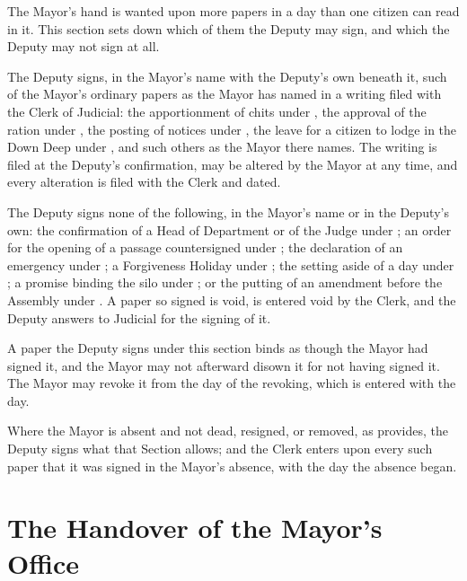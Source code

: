 The Mayor's hand is wanted upon more papers in a day than one citizen can read in it. This section sets down which of them the Deputy may sign, and which the Deputy may not sign at all.

\begin{clauses}
\item The Deputy signs, in the Mayor's name with the Deputy's own beneath it, such of the Mayor's ordinary papers as the Mayor has named in a writing filed with the Clerk of Judicial: the apportionment of chits under , the approval of the ration under , the posting of notices under , the leave for a citizen to lodge in the Down Deep under , and such others as the Mayor there names. The writing is filed at the Deputy's confirmation, may be altered by the Mayor at any time, and every alteration is filed with the Clerk and dated.
\item The Deputy signs none of the following, in the Mayor's name or in the Deputy's own: the confirmation of a Head of Department or of the Judge under ; an order for the opening of a passage countersigned under ; the declaration of an emergency under ; a Forgiveness Holiday under ; the setting aside of a day under ; a promise binding the silo under ; or the putting of an amendment before the Assembly under . A paper so signed is void, is entered void by the Clerk, and the Deputy answers to Judicial for the signing of it.
\item A paper the Deputy signs under this section binds as though the Mayor had signed it, and the Mayor may not afterward disown it for not having signed it. The Mayor may revoke it from the day of the revoking, which is entered with the day.
\item Where the Mayor is absent and not dead, resigned, or removed, as  provides, the Deputy signs what that Section allows; and the Clerk enters upon every such paper that it was signed in the Mayor's absence, with the day the absence began.
\end{clauses}

\section{The Handover of the Mayor's Office}
\label{sec:succession:handover-of-the-mayors-office}

